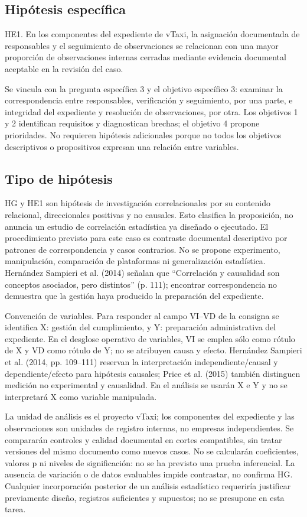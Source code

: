 {\subsection{Hipótesis específica}
HE1. En los componentes del expediente de vTaxi, la asignación documentada de responsables y el seguimiento de observaciones se relacionan con una mayor proporción de observaciones internas cerradas mediante evidencia documental aceptable en la revisión del caso.


Se vincula con la pregunta específica 3 y el objetivo específico 3: examinar la correspondencia entre responsables, verificación y seguimiento, por una parte, e integridad del expediente y resolución de observaciones, por otra. Los objetivos 1 y 2 identifican requisitos y diagnostican brechas; el objetivo 4 propone prioridades. No requieren hipótesis adicionales porque no todos los objetivos descriptivos o propositivos expresan una relación entre variables.


\subsection{Tipo de hipótesis}
HG y HE1 son hipótesis de investigación correlacionales por su contenido relacional, direccionales positivas y no causales. Esto clasifica la proposición, no anuncia un estudio de correlación estadística ya diseñado o ejecutado. El procedimiento previsto para este caso es contraste documental descriptivo por patrones de correspondencia y casos contrarios. No se propone experimento, manipulación, comparación de plataformas ni generalización estadística. Hernández Sampieri et al. (2014) señalan que “Correlación y causalidad son conceptos asociados, pero distintos” (p. 111); encontrar correspondencia no demuestra que la gestión haya producido la preparación del expediente.


Convención de variables. Para responder al campo VI–VD de la consigna se identifica X: gestión del cumplimiento, y Y: preparación administrativa del expediente. En el desglose operativo de variables, VI se emplea sólo como rótulo de X y VD como rótulo de Y; no se atribuyen causa y efecto. Hernández Sampieri et al. (2014, pp. 109–111) reservan la interpretación independiente/causal y dependiente/efecto para hipótesis causales; Price et al. (2015) también distinguen medición no experimental y causalidad. En el análisis se usarán X e Y y no se interpretará X como variable manipulada.


La unidad de análisis es el proyecto vTaxi; los componentes del expediente y las observaciones son unidades de registro internas, no empresas independientes. Se compararán controles y calidad documental en cortes compatibles, sin tratar versiones del mismo documento como nuevos casos. No se calcularán coeficientes, valores p ni niveles de significación: no se ha previsto una prueba inferencial. La ausencia de variación o de datos evaluables impide contrastar, no confirma HG. Cualquier incorporación posterior de un análisis estadístico requeriría justificar previamente diseño, registros suficientes y supuestos; no se presupone en esta tarea.


}
